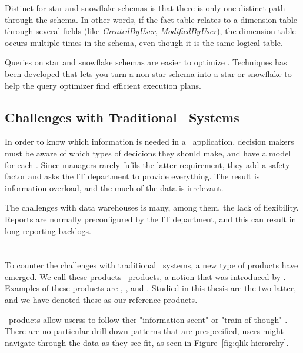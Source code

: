 Distinct for star and snowflake schemas is that there is only one distinct path through the schema. In other words, if the fact table relates to a dimension table through several fields (like \textit{CreatedByUser}, \textit{ModifiedByUser}), the dimension table occurs multiple times in the schema, even though it is the same logical table. 

Queries on star and snowflake schemas are easier to optimize \cite{Lamb2012-kg} . Techniques has been developed that lets you turn a non-star schema into a star or snowflake to help the query optimizer find efficient execution plans.

\subsection{Challenges with Traditional \bi~Systems}
\label{sub:Challenges with Traditional Business Intelligence Systems}
In order to know which information is needed in a \bi~application, decision makers must be aware of which types of decicions they should make, and have a model for each \cite{Ackoff1999-wk}. Since managers rarely fufils the latter requirement, they add a safety factor and asks the IT department to provide everything. The result is information overload, and the much of the data is irrelevant. 

The challenges with data warehouses is many, among them, the lack of flexibility. Reports are normally preconfigured by the IT department, and this can result in long reporting backlogs.

\section{\bd}
\label{sec:Business Discovery}
To counter the challenges with traditional \bi~systems, a new type of products have emerged. We call these products \bd~products, a notion that was introduced by \qlikview \cite{Qlik2014-vd}. Examples of these products are \powerpivot, \tableau, and \qlikview. Studied in this thesis are the two latter, and we have denoted these as our reference products.

\bd~products allow userss to follow ther "information scent" or "train of though" \cite{Qlik2014-vd, Kamkolkar2015-iq}. There are no particular drill-down patterns that are prespecified, users might navigate through the data as they see fit, as seen in Figure~\ref{fig:qlik-hierarchy}.

